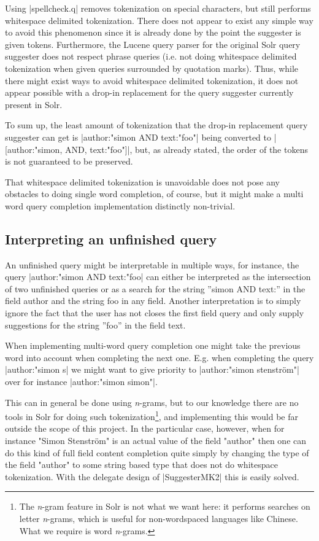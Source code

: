 Using |spellcheck.q| removes tokenization on special characters, but still performs whitespace delimited tokenization. There does not appear to exist any simple way to avoid this phenomenon since it is already done by the point the suggester is given tokens. Furthermore, the Lucene query parser for the original Solr query suggester does not respect phrase queries (i.e. not doing whitespace delimited tokenization when given queries surrounded by quotation marks). Thus, while there might exist ways to avoid whitespace delimited tokenization, it does not appear possible with a drop-in replacement for the query suggester currently present in Solr.

To sum up, the least amount of tokenization that the drop-in replacement query suggester can get is |author:"simon AND text:"foo"| being converted to |[author:"simon, AND, text:"foo"]|, but, as already stated, the order of the tokens is not guaranteed to be preserved.

That whitespace delimited tokenization is unavoidable does not pose any obstacles to doing single word completion, of course, but it might make a multi word query completion implementation distinctly non-trivial. 

\subsection{Interpreting an unfinished query}

An unfinished query might be interpretable in multiple ways, for instance, the query |author:"simon AND text:"foo| can either be interpreted as the intersection of two unfinished queries or as a search for the string ''simon AND text:'' in the field author and the string foo in any field. Another interpretation is to simply ignore the fact that the user has not closes the first field query and only supply suggestions for the string ''foo'' in the field text. 

When implementing multi-word query completion one might take the previous word into account when completing the next one. E.g. when completing the query |author:"simon s| we might want to give priority to |author:"simon stenström"| over for instance |author:"simon simon"|.

This can in general be done using \emph{n}-grams, but to our knowledge there are no tools in Solr for doing such tokenization\footnote{The \emph{n}-gram feature in Solr is not what we want here: it performs searches on letter \emph{n}-grams, which is useful for non-wordspaced languages like Chinese. What we require is word \emph{n}-grams.}, and implementing this would be far outside the scope of this project. In the particular case, however, when for instance "Simon Stenström" is an actual value of the field "author" then one can do this kind of full field content completion quite simply by changing the type of the field "author" to some string based type that does not do whitespace tokenization. With the delegate design of |SuggesterMK2| this is easily solved.


